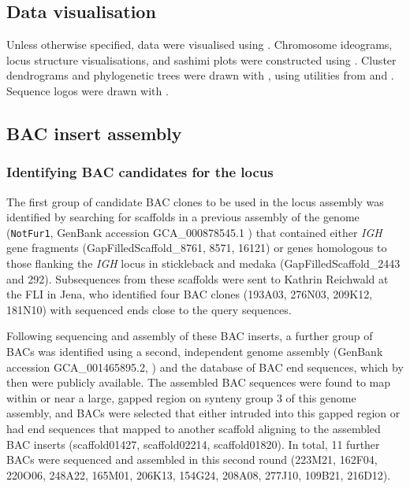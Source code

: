 \subsection{Data visualisation}
\label{sec:methods_comp_visualisation}

Unless otherwise specified, data were visualised using  \parencite{wickham2016ggplot2}. Chromosome ideograms, locus structure visualisations, and sashimi plots were constructed using  \parencite{hahne2016gviz}. Cluster dendrograms and phylogenetic trees were drawn with  \parencite{guangchuang2018ggtree}, using utilities from  \parencite{paradis2018ape} and  \parencite{guangchuang2018tidytree}. Sequence logos were drawn with  \parencite{wagih2017ggseqlogo}. 

\subsection{BAC insert assembly}
\label{sec:methods_comp_bacs}

\subsubsection{Identifying BAC candidates for the \nfu \igh{} locus}
\label{sec:methods_comp_bacs_ident}

The first group of candidate BAC clones to be used in the \Nfu locus assembly was identified by searching for scaffolds in a previous assembly of the \Nfu genome (\texttt{NotFur1}, GenBank accession GCA\_000878545.1 \parencite{valenzano2015genome}) that contained either \textit{IGH} gene fragments (GapFilledScaffold\_8761, 8571, 16121) or genes homologous to those flanking the \textit{IGH} locus in stickleback and medaka (GapFilledScaffold\_2443 and 292). Subsequences from these scaffolds were sent to Kathrin Reichwald at the FLI in Jena, who identified four BAC clones (193A03, 276N03, 209K12, 181N10) with sequenced ends close to the query sequences.

Following sequencing and assembly of these BAC inserts, a further group of BACs was identified using a second, independent genome assembly (GenBank accession 	GCA\_001465895.2, \parencite{reichwald2015genome}) and the database of BAC end sequences, which by then were publicly available. The assembled BAC sequences were found to map within or near a large, gapped region on synteny group 3 of this genome assembly, and BACs were selected that either intruded into this gapped region or had end sequences that mapped to another scaffold aligning to the assembled BAC inserts (scaffold01427, scaffold02214, scaffold01820). In total, 11 further BACs were sequenced and assembled in this second round (223M21, 162F04, 220O06, 248A22, 165M01, 206K13, 154G24, 208A08, 277J10, 109B21, 216D12).

